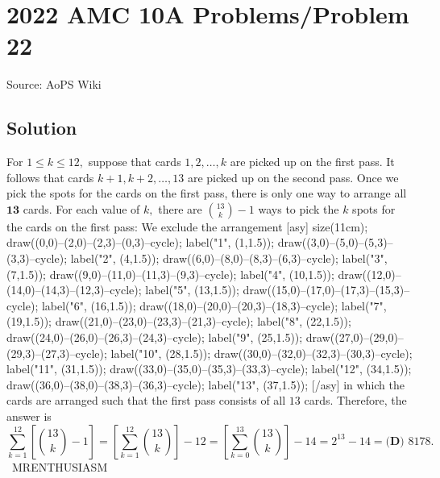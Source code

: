 \documentclass[12pt]{article}
\begin{document}
\section*{{2022 AMC 10A Problems/Problem 22}}
Source: AoPS Wiki

\subsection*{Solution}
For $1\leq k\leq 12,$ suppose that cards $1, 2, \ldots, k$ are picked up on the first pass. It follows that cards $k+1,k+2,\ldots,13$ are picked up on the second pass. Once we pick the spots for the cards on the first pass, there is only one way to arrange all $\boldsymbol{13}$ cards. For each value of $k,$ there are $\binom{13}{k}-1$ ways to pick the $k$ spots for the cards on the first pass: We exclude the arrangement [asy] size(11cm); draw((0,0)--(2,0)--(2,3)--(0,3)--cycle); label("1", (1,1.5)); draw((3,0)--(5,0)--(5,3)--(3,3)--cycle); label("2", (4,1.5)); draw((6,0)--(8,0)--(8,3)--(6,3)--cycle); label("3", (7,1.5)); draw((9,0)--(11,0)--(11,3)--(9,3)--cycle); label("4", (10,1.5)); draw((12,0)--(14,0)--(14,3)--(12,3)--cycle); label("5", (13,1.5)); draw((15,0)--(17,0)--(17,3)--(15,3)--cycle); label("6", (16,1.5)); draw((18,0)--(20,0)--(20,3)--(18,3)--cycle); label("7", (19,1.5)); draw((21,0)--(23,0)--(23,3)--(21,3)--cycle); label("8", (22,1.5)); draw((24,0)--(26,0)--(26,3)--(24,3)--cycle); label("9", (25,1.5)); draw((27,0)--(29,0)--(29,3)--(27,3)--cycle); label("10", (28,1.5)); draw((30,0)--(32,0)--(32,3)--(30,3)--cycle); label("11", (31,1.5)); draw((33,0)--(35,0)--(35,3)--(33,3)--cycle); label("12", (34,1.5)); draw((36,0)--(38,0)--(38,3)--(36,3)--cycle); label("13", (37,1.5)); [/asy] in which the cards are arranged such that the first pass consists of all $13$ cards. Therefore, the answer is \[\sum_{k=1}^{12}\left[\binom{13}{k}-1\right] = \left[\sum_{k=1}^{12}\binom{13}{k}\right]-12 = \left[\sum_{k=0}^{13}\binom{13}{k}\right]-14 = 2^{13} - 14 = \boxed{\textbf{(D) } 8178}.\] ~MRENTHUSIASM
\end{document}
